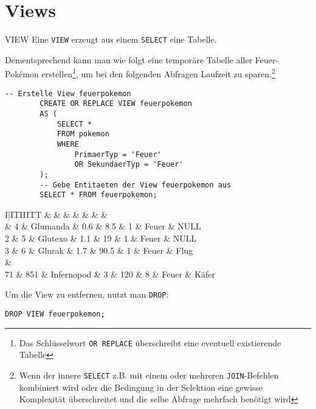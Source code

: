 \section{Views}

\begin{sql}{VIEW}
    Eine \texttt{VIEW} erzeugt aus einem \texttt{SELECT} eine Tabelle.

    Dementsprechend kann man wie folgt eine temporäre Tabelle aller Feuer-Pokémon erstellen\footnote{Das Schlüsselwort \texttt{OR REPLACE} überschreibt eine eventuell existierende Tabelle}, um bei den folgenden Abfragen Laufzeit zu sparen.\footnote{Wenn der innere \texttt{SELECT} z.B. mit einem oder mehreren \texttt{JOIN}-Befehlen kombiniert wird oder die Bedingung in der Selektion eine gewisse Komplexität überschreitet und die selbe Abfrage mehrfach benötigt wird}

    \begin{lstlisting}[language=mysql]
        -- Erstelle View feuerpokemon
        CREATE OR REPLACE VIEW feuerpokemon
        AS (
            SELECT *
            FROM pokemon
            WHERE
                PrimaerTyp = 'Feuer'
                OR SekundaerTyp = 'Feuer'
        );
        -- Gebe Entitaeten der View feuerpokemon aus
        SELECT * FROM feuerpokemon;
    \end{lstlisting}

    \begin{tabular}{I|ITIIITT}
        &  &  &  &  &  &  &  \\ & 4 & Glumanda & 0.6 & 8.5 & 1 & Feuer & NULL \\
        2 & 5 & Glutexo & 1.1 & 19 & 1 & Feuer & NULL \\
        3 & 6 & Glurak & 1.7 & 90.5 & 1 & Feuer & Flug \\
         &  \\
        71 & 851 & Infernopod & 3 & 120 & 8 & Feuer & Käfer \\
    \end{tabular}

    Um die View zu entfernen, nutzt man \texttt{DROP}:

    \begin{lstlisting}[language=mysql]
        DROP VIEW feuerpokemon;
    \end{lstlisting}
\end{sql}